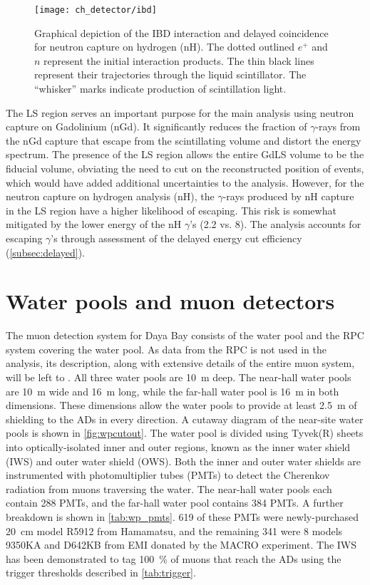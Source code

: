 \begin{figure}
    \centering
    \texttt{[image: ch\_detector/ibd]}
    \caption{
        Graphical depiction of the IBD interaction and delayed coincidence
        for neutron capture on hydrogen (nH).
        The dotted outlined $e^+$ and $n$ represent the initial interaction products.
        The thin black lines represent their trajectories
        through the liquid scintillator.
        The ``whisker'' marks indicate production of scintillation light.
    }
    \label{fig:ibd_cartoon}
\end{figure}

The LS region serves an important purpose for the main \thetaot{}
analysis using neutron capture on Gadolinium (nGd).
It significantly reduces the fraction of $\gamma$-rays from the nGd capture
that escape from the scintillating volume and distort the energy spectrum.
The presence of the LS region allows the entire GdLS volume to be
the fiducial volume, obviating the need to cut on the reconstructed position
of events, which would have added additional uncertainties to the analysis.
However, for the neutron capture on hydrogen analysis (nH),
the $\gamma$-rays produced by nH capture in the LS region
have a higher likelihood of escaping.
This risk is somewhat mitigated by the lower energy of the nH $\gamma$'s
(\SI{2.2}{\mev} vs. \SI{8}{\mev}).
The \thetaot{} analysis accounts for escaping $\gamma$'s
through assessment of the delayed energy cut efficiency (\cref{subsec:delayed}).


\section{Water pools and muon detectors}
\label{sec:wp}

The muon detection system for Daya Bay consists of
the water pool and the RPC system covering the water pool.
As data from the RPC is not used in the \thetaot{} analysis,
its description, along with extensive details of the entire muon system,
will be left to \cite{muonsystem2015}.
All three water pools are \SI{10}{\m} deep.
The near-hall water pools are \SI{10}{\m} wide and \SI{16}{\m} long,
while the far-hall water pool is \SI{16}{\m} in both dimensions.
These dimensions allow the water pools to provide at least \SI{2.5}{\m} of shielding
to the ADs in every direction.
A cutaway diagram of the near-site water pools is shown in \cref{fig:wpcutout}.
The water pool is divided using Tyvek(R) sheets
into optically-isolated inner and outer regions,
known as the inner water shield (IWS) and outer water shield (OWS).
Both the inner and outer water shields are instrumented with photomultiplier tubes (PMTs)
to detect the Cherenkov radiation from muons traversing the water.
The near-hall water pools each contain \num{288} PMTs,
and the far-hall water pool contains \num{384} PMTs.
A further breakdown is shown in \cref{tab:wp_pmts}.
\num{619} of these PMTs were newly-purchased \SI{20}{\cm}
model R5912 from Hamamatsu,
and the remaining \num{341} were \SI{8}{\inch} models 9350KA
and D642KB from EMI
donated by the MACRO experiment.
The IWS has been demonstrated to tag \SI{100}{\percent} of muons
that reach the ADs using the trigger thresholds described in \cref{tab:trigger}.


